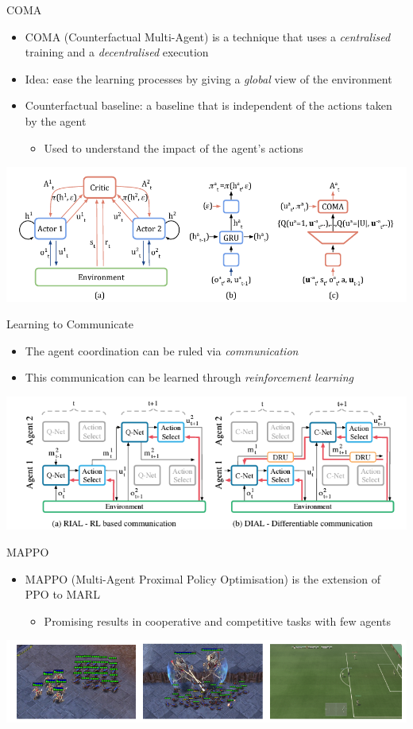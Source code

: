 \documentclass[presentation, 8pt]{beamer}\mode<presentation>{\usetheme{AMSBolognaFC}}
\begin{document}
\begin{frame}{COMA}
	\begin{itemize}
		\item COMA (Counterfactual Multi-Agent) is a technique that uses a \emph{centralised} training and a \emph{decentralised} execution
		\item Idea: ease the learning processes by giving a \emph{global} view of the environment 
		\item Counterfactual baseline: a baseline that is independent of the actions taken by the agent
		\begin{itemize}
			\item Used to understand the impact of the agent's actions
		\end{itemize}
	\end{itemize}
	\includegraphics[width=\textwidth]{img/coma.png}
\end{frame}
\begin{frame}{Learning to Communicate}
	\begin{itemize}
		\item The agent coordination can be ruled via \emph{communication}
		\item This communication can be learned through \emph{reinforcement learning}
	\end{itemize}
	\centering
	\includegraphics[width=\textwidth]{img/learning-to-communicate.png}
\end{frame}
\begin{frame}{MAPPO}
	\begin{itemize}
		\item MAPPO (Multi-Agent Proximal Policy Optimisation) is the extension of PPO to MARL
		\begin{itemize}
			\item Promising results in cooperative and competitive tasks with few agents
		\end{itemize}
	\end{itemize}
	\centering
	\includegraphics[width=\textwidth]{img/mappo.png}
\end{frame}
\end{document}
